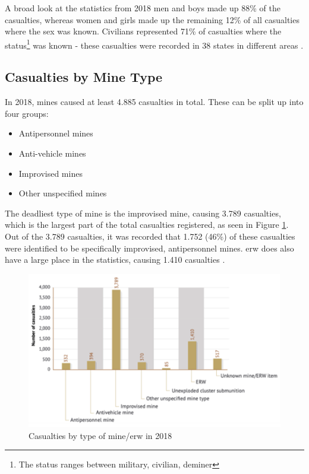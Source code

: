         \vspace{2mm}

A broad look at the statistics from 2018 men and boys made up 88\% of the casualties, whereas women and girls made up the remaining 12\% of all casualties where the sex was known. Civilians represented 71\% of casualties where the status\footnote{The status ranges between military, civilian, deminer} was known - these casualties were recorded in 38 states in different areas \cite{LandmineMonitor2019}.

\subsection{Casualties by Mine Type}

In 2018, mines caused at least 4.885 casualties in total. These can be split up into four groups: 
\begin{itemize}
    \item Antipersonnel mines
            \vspace{-4mm}
    \item Anti-vehicle mines
            \vspace{-4mm}
    \item Improvised mines
            \vspace{-4mm}
    \item Other unspecified mines
\end{itemize}

The deadliest type of mine is the improvised mine, causing 3.789 casualties, which is the largest part of the total casualties registered, as seen in Figure \ref{fig:casualties_by_type}. Out of the 3.789 casualties, it was recorded that 1.752 (46\%) of these casualties were identified to be specifically improvised, antipersonnel mines. \gls{erw} does also have a large place in the statistics, causing 1.410 casualties \cite{LandmineMonitor2019}.

\begin{figure}[!ht]
  \centering
  \includegraphics[width=12.5cm]{00 - Images/casualties_by_type.png}
  \caption{Casualties by type of mine/\gls{erw} in 2018 \cite{LandmineMonitor2019}}
  \label{fig:casualties_by_type}
\end{figure}